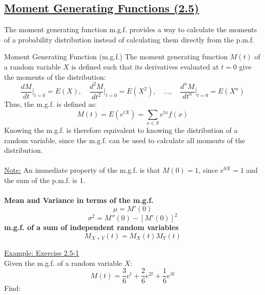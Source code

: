 ﻿\documentclass[12pt]{article}
\begin{document}
\subsection*{\underline{Moment Generating Functions (2.5)}}
The moment generating function m.g.f. provides a way to calculate the moments of a probability distribution instead of calculating them directly from the p.m.f.
\begin{definition}{Moment Generating Function (m.g.f.)}
    The moment generating function $M(t)$ of a random variable $X$ is defined such that its derivatives evaluated at $t=0$ give the moments of the distribution:
    \[\frac{dM}{dt}\bigg|_{t=0} = E(X),\quad \frac{d^2M}{dt^2}\bigg|_{t=0} = E(X^2),\quad \ldots,\quad \frac{d^nM}{dt^n}\bigg|_{t=0} = E(X^n)\]
    Thus, the m.g.f. is defined as:
    \[\boxed{M(t)=E(e^{tX})=\sum_{x\in S}e^{tx}f(x)}\]
    Knowing the m.g.f. is therefore equivalent to knowing the distribution of a random variable, since the m.g.f. can be used to calculate all moments of the distribution.\\\\
    \underline{Note:} An immediate property of the m.g.f. is that $M(0)=1$, since $e^{0X}=1$ and the sum of the p.m.f. is 1.\\\\
    \textbf{Mean and Variance in terms of the m.g.f.}
    \[
\boxed{\mu=M'(0)}
\]
\[
\boxed{\sigma^2=M''(0)-[M'(0)]^2}
\]
\textbf{m.g.f. of a sum of independent random variables}
\[
\boxed{M_{X+Y}(t)=M_X(t)M_Y(t)}
\]
\end{definition}
\underline{Example: Exercise 2.5-1}\\
Given the m.g.f. of a random variable $X$:
\[
M(t)=\frac{3}{6}e^t+\frac{2}{6}e^{2t}+\frac{1}{6}e^{3t}
\]
\newpage
Find:
\end{document}
